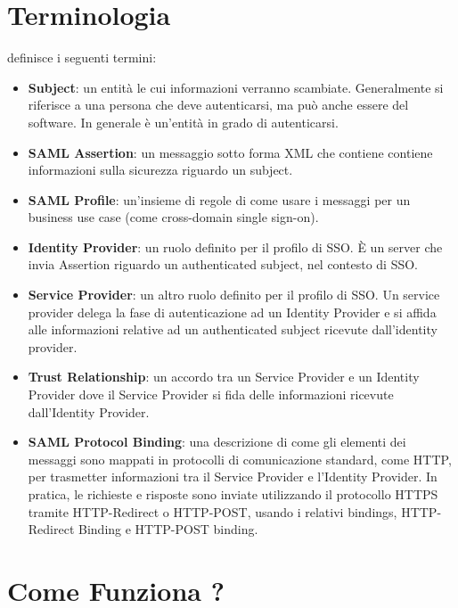 \section{Terminologia}

\saml{} definisce i seguenti termini:

\begin{itemize}
      \item \textbf{Subject}: un entità le cui informazioni verranno scambiate.
            Generalmente si riferisce a una persona che deve autenticarsi,
            ma può anche essere
            del software. In generale è un'entità in grado di autenticarsi.
      \item \textbf{SAML Assertion}: un messaggio sotto forma XML che contiene
            contiene informazioni sulla sicurezza riguardo un subject.
      \item \textbf{SAML Profile}: un'insieme di regole di come usare i messaggi \saml{}
            per un business use case (come cross-domain single sign-on).
      \item \textbf{Identity Provider}: un ruolo definito per il profilo \saml{} di SSO.
            È un server che invia \saml{} Assertion riguardo un authenticated subject, nel
            contesto di SSO.
      \item \textbf{Service Provider}: un altro ruolo definito per il profilo \saml{} di
            SSO. Un service provider delega la fase di autenticazione ad un Identity
            Provider e si affida alle informazioni relative ad un authenticated
            subject ricevute dall'identity provider.
      \item \textbf{Trust Relationship}: un accordo tra un \saml{} Service Provider e un
            \saml{} Identity Provider dove il Service Provider si fida delle informazioni
            ricevute dall'Identity Provider.
      \item \textbf{SAML Protocol Binding}: una descrizione di come gli elementi
            dei messaggi \saml{} sono mappati in protocolli di comunicazione standard,
            come HTTP, per trasmetter informazioni tra il Service Provider e l'Identity
            Provider. In pratica, le richieste e risposte \saml{} sono inviate utilizzando
            il protocollo HTTPS tramite HTTP-Redirect o HTTP-POST, usando i relativi
            bindings, HTTP-Redirect Binding e HTTP-POST binding.
\end{itemize}

\section{Come Funziona ?}


